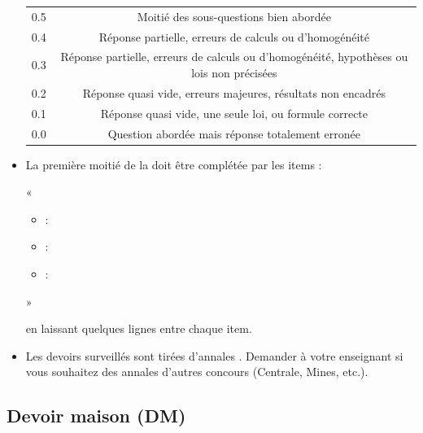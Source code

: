 \documentclass[12pt,fancy]{cours}
\begin{document}
\begin{itemize}
\begin{center}
{\begin{tabular}{|c|c|}
                  0.5 & Moitié des sous-questions bien abordée \\
                  0.4 & Réponse partielle, erreurs de calculs ou d'homogénéité \\
                  0.3 & Réponse partielle, erreurs de calculs ou d'homogénéité, hypothèses ou lois non précisées \\
                  0.2 & Réponse quasi vide, erreurs majeures, résultats non encadrés \\
                  0.1 & Réponse quasi vide, une seule loi, ou formule correcte \\
                  0.0 & Question abordée mais réponse totalement erronée \\
                  \hline
            \end{tabular}
            }
      \end{center}
      \item La première moitié de la  doit être complétée par les items :
      
      «\begin{itemize}
            \item {} :
            \item {} :
            \item {} :
      \end{itemize}»

      en laissant quelques lignes entre chaque item.
      \item Les devoirs surveillés sont tirées d'annales . Demander à votre enseignant si vous souhaitez des annales d'autres concours (Centrale, Mines, etc.).
\end{itemize}


\subsection{Devoir maison (DM)}
\end{document}
